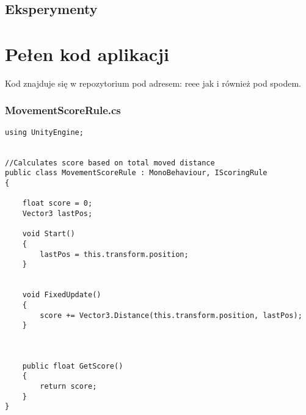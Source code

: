 \documentclass[12pt,a4paper]{article}
\begin{document}
\subsection*{Eksperymenty}


\newpage
\section*{Pełen kod aplikacji}
Kod znajduje się w repozytorium pod adresem: reee
jak i również pod spodem.



\subsubsection*{MovementScoreRule.cs}
\begin{lstlisting}
using UnityEngine;


//Calculates score based on total moved distance
public class MovementScoreRule : MonoBehaviour, IScoringRule
{

    float score = 0;
    Vector3 lastPos;

    void Start()
    {
        lastPos = this.transform.position;
    }


    void FixedUpdate()
    {
        score += Vector3.Distance(this.transform.position, lastPos);
    }



    public float GetScore()
    {
        return score;
    }
}\end{lstlisting}
\pagebreak
\end{document}
